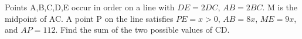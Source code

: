 Points A,B,C,D,E occur in order on a line with $DE=2DC$, $AB=2BC$. M is the midpoint of AC. A point P on the line satisfies $PE=x>0$, $AB=8x$, $ME=9x$, and $AP=112$. Find the sum of the two possible values of CD.
